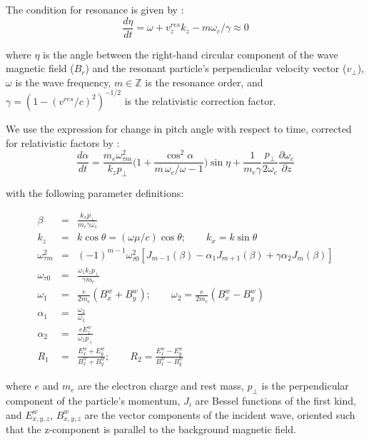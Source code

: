 The condition for resonance is given by \cite{Chang1983a}:
\begin{equation}
\frac{d \eta}{dt} = \omega + v_z^{res} k_z - m \omega_c / \gamma \approx 0
\end{equation}

where $\eta$ is the angle between the right-hand circular component of the wave magnetic field ($B_r$) and the resonant particle's perpendicular velocity vector ($v_\perp$), $\omega$ is the wave frequency, $m \in \mathbb Z$ is the resonance order, and $\gamma = (1 - (v^{res}/c)^2)^{-1/2}$ is the relativistic correction factor.

We use the \cite{Bell1984} expression for change in pitch angle with respect to time, corrected for relativistic factors by \cite{Ristic1993, Bortnik2006}:
\begin{equation}
\frac{d\alpha}{dt} = \frac{m_e \omega_{\tau m}^2}{k_z p_\perp} \bigg( 1 + \frac{\cos^2\alpha}{m\,\omega_c / \omega - 1}\bigg)\sin \eta + \frac{1}{m_e \gamma}\frac{p_\perp}{2 \omega_c}\frac{\partial \omega_c}{\partial z}
\label{eqn:bell_dadt}
\end{equation}

with the following parameter definitions:

\begin{eqnarray}
\beta & = &\frac{k_x p_\perp}{m_e \gamma \omega_c} \\
k_z & = & k \cos \theta = (\omega \mu / c) \cos \theta; \qquad k_x = k \sin \theta \\
\omega_{\tau m}^2 & = & (-1)^{m-1}\omega_{\tau 0}^2 [J_{m-1}(\beta) - \alpha_1 J_{m+1}(\beta) + \gamma \alpha_2 J_m(\beta)] \\
\omega_{\tau 0} & = & \frac{\omega_1 k_z p_\perp}{\gamma m_e} \\
\omega_1 & = & \frac{e}{2 m_e} (B_x^w + B_y^w); \qquad \omega_2 = \frac{e}{2 m_e}(B_x^w - B_y^w) \\
\alpha_1 & = & \frac{\omega_2}{\omega_1} \\
\alpha_2 & = & \frac{e E_z^w}{\omega_1 p_\perp} \\
R_1 & = & \frac{E_x^w + E_y^w}{B_x^w + B_y^w}; \qquad R_2 =  \frac{E_x^w - E_y^w}{B_x^w - B_y^w}
\label{eqn:dadt_subparams}
\end{eqnarray}

where $e$ and $m_e$ are the electron charge and rest mass, $p_\perp$ is the perpendicular component of the particle's momentum, $J_i$ are Bessel functions of the first kind, and $E_{x,y,z}^w$, $B_{x,y,z}^w$ are the vector components of the incident wave, oriented such that the z-component is parallel to the background magnetic field.

